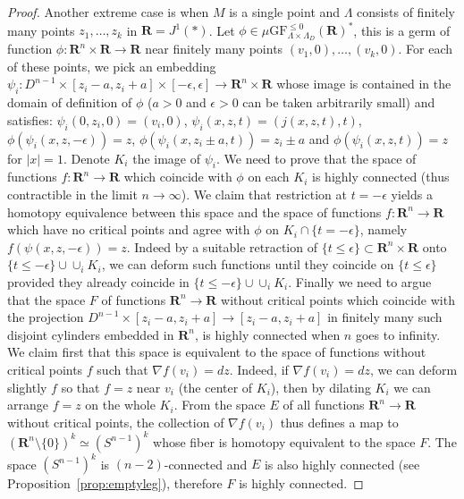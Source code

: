 \documentclass[12pt,a4paper]{article}
\numberwithin{equation}{section}
\theoremstyle{definition}
\theoremstyle{remark}
\newcommand{\R}{\mathbf{R}}
\newcommand{\GF}{\mathrm{GF}}
\begin{document}
\begin{proof}
Another extreme case is when $M$ is a single point and $\Lambda$ consists of finitely many points $z_1,\dots,z_k$ in $\R=J^1(*)$.
Let $\phi\in \mu\GF^{\leq 0}_{\Lambda\times \Lambda_D}(\R)^*$, this is a germ of function $\phi:\R^n\times \R \to \R$
near finitely many points $(v_1,0),\dots,(v_k,0)$. For each of these points, we pick an embedding $\psi_i:D^{n-1} \times [z_i-a,z_i+a]\times[-\epsilon,\epsilon]\to \R^n\times \R$ whose image is contained in the domain of definition of $\phi$ ($a>0$ and $\epsilon>0$ can be taken arbitrarily small) and satisfies:
$\psi_i(0,z_i,0)=(v_i,0)$, $\psi_i(x,z,t)=(j(x,z,t),t)$, $\phi(\psi_i(x,z,-\epsilon))=z$, $\phi(\psi_i(x,z_i\pm a,t))=z_i\pm a$
and $\phi(\psi_i(x,z,t))=z$ for $|x|=1$. Denote $K_i$ the image of $\psi_i$.
We need to prove that the space of functions $f:\R^n\to \R$ which coincide with $\phi$ on each $K_i$ is highly connected (thus contractible in the limit $n\to \infty$).
We claim that restriction at $t=-\epsilon$ yields a homotopy equivalence between this space and the space of functions
$f:\R^n\to \R$ which have no critical points and agree with $\phi$ on $K_i\cap\{t=-\epsilon\}$, namely $f(\psi(x,z,-\epsilon))=z$.
Indeed by a suitable retraction of $\{t\leq \epsilon\}\subset \R^n\times \R$ onto $\{t\leq -\epsilon\}\cup \cup_i K_i$, we can deform
such functions until they coincide on $\{t\leq \epsilon\}$ provided they already coincide in $\{t\leq-\epsilon\}\cup \cup_i K_i$.
Finally we need to argue that the space $F$ of functions $\R^n\to \R$ without critical points which coincide with the projection $D^{n-1}\times [z_i-a,z_i+a]\to [z_i-a,z_i+a]$ in finitely many such disjoint cylinders embedded in $\R^n$, is highly connected when $n$ goes to infinity.
We claim first that this space is equivalent to the space of functions without critical points $f$ such that $\nabla f(v_i)=dz$.
Indeed, if $\nabla f (v_i)=dz$, we can deform slightly $f$ so that $f=z$ near $v_i$ (the center of $K_i$), then by dilating $K_i$ we can arrange $f=z$
on the whole $K_i$. From the space $E$ of all functions $\R^n\to \R$ without critical points, the collection of $\nabla f(v_i)$ thus defines a map to $(\R^n\setminus\{0\})^k\simeq (S^{n-1})^k$ whose fiber is homotopy equivalent to the space $F$.
The space $(S^{n-1})^k$ is $(n-2)$-connected and $E$ is also highly connected (see Proposition~\ref{prop:emptyleg}), therefore $F$ is highly connected.


\end{proof}
\end{document}
